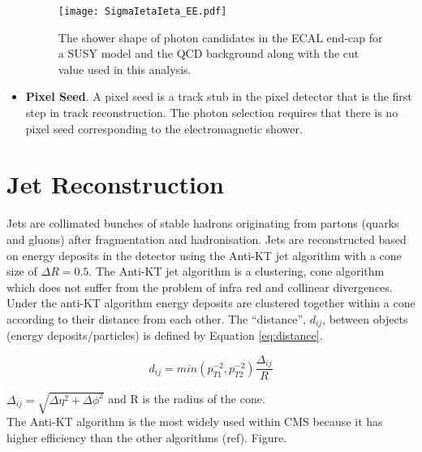 \begin{itemize}
\begin{figure}
\begin{center}
\texttt{[image: SigmaIetaIeta\_EE.pdf]}
\end{center}
\caption{The shower shape of photon candidates in the ECAL end-cap for a SUSY 
model and the QCD background along with the cut value used in this analysis.} 
\label{fig:SigmaIetaIeta_EE}
\end{figure}

\item {\bf Pixel Seed}. A pixel seed is a track stub in the pixel detector that 
is the first step in track reconstruction. The photon selection requires that 
there is no pixel seed corresponding to the electromagnetic shower.
\end{itemize}

\section{Jet Reconstruction}

Jets are collimated bunches of stable hadrons originating from partons (quarks
and gluons) after fragmentation and hadronisation. Jets are reconstructed based 
on energy deposits in the detector using the Anti-KT jet algorithm with a cone 
size of $\Delta R = 0.5$. The Anti-KT jet algorithm is a clustering, cone 
algorithm which does not suffer from the problem of infra red and collinear 
divergences. \\

Under the anti-KT algorithm energy deposits are clustered together within a cone
according to their distance from each other. The ``distance'', $d_{ij}$, between 
objects (energy deposits/particles) is defined by Equation \ref{eq:distance}.

\begin{equation}
d_{ij} = min(p_{T1}^{-2}, p_{T2}^{-2})\frac{\Delta_{ij}}{R}
\label{eq:distance}
\end{equation}

$\Delta_{ij} = \sqrt{\Delta \eta^{2} + \Delta \phi^{2}}$ and R is the radius of
the cone. \\

The Anti-KT algorithm is the most widely used within CMS because it has higher 
efficiency than the other algorithms (ref). Figure. \\


